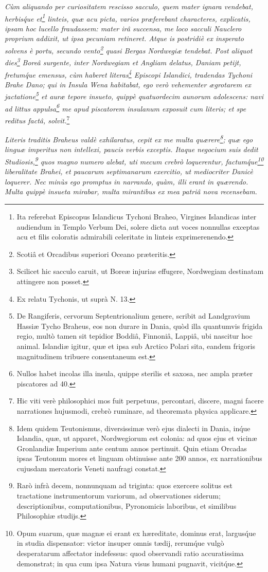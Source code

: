 \documentclass[a4paper, 11pt, oneside, polutonikogreek, german]{article}
\begin{document}
\emph{Cùm aliquando per curiositatem rescisso sacculo, quem mater ignara vendebat, herbis\'que et\footnote{Ita referebat Episcopus Islandicus Tychoni Braheo, Virgines Islandicas inter audiendum in Templo Verbum Dei, solere dicta aut voces nonnullas exceptas acu et filis coloratis admirabili celeritate in linteis exprimerenendo.} linteis, quæ acu picta, varios præferebant characteres, explicatis, ipsam hoc lucello fraudassem: mater irâ succensa, me loco sacculi Nauclero proprium addixit, ut ipsa pecuniam retineret. Atque is postridiè ex insperato solvens è portu, secundo vento\footnote{Scotiâ et Orcadibus superiori Oceano præteritis.} quasi Bergas Nordwegiæ tendebat. Post aliquot dies\footnote{Scilicet hic sacculo caruit, ut Boreæ injurias effugere, Nordwegiam destinatam attingere non posset.} Boreâ surgente, inter Nordwegiam et Angliam delatus, Daniam petijt, fretum\'que emensus, cùm haberet literas\footnote{Ex relatu Tychonis, ut suprà N. 13.} Episcopi Islandici, tradendas Tychoni Brahe Dano; qui in Insula Wena habitabat, ego verò vehementer ægrotarem ex jactatione\footnote{De Rangiferis, cervorum Septentrionalium genere, scribit ad Landgravium Hassiæ Tycho Braheus, eos non durare in Dania, quòd illa quantumvis frigida regio, multò tamen sit tepidior Boddiâ, Finnoniâ, Lappiâ, ubi nascitur hoc animal. Islandiæ igitur, quæ et ipsa sub Arctico Polari sita, eandem frigoris magnitudinem tribuere consentaneum est.} et auræ tepore insueto, quippè quatuordecim aunorum adolescens: navi ad littus appulsa\footnote{Nullos habet incolas illa insula, quippe sterilis et saxosa, nec ampla præter piscatores ad 40.} me apud piscatorem insulanum exposuit cum literis; et spe reditus factâ, solvit.}\footnote{Hic viti verè philosophici mos fuit perpetuus, percontari, discere, magni facere narrationes hujusmodi, crebrò ruminare, ad theoremata physica applicare.}

\emph{Literis traditis Braheus valdè exhilaratus, cepit ex me multa quærere\footnote{Idem quidem Teutonismus, diversissimæ verò ejus dialecti in Dania, in\'que Islandia, quæ, ut apparet, Nordwegiorum est colonia: ad quos ejus et vicinæ Gronlandiæ Imperium ante centum annos pertinuit. Quin etiam Orcadas ipsas Teutonum mores et linguam obtinuisse ante 200 annos, ex narrationibus cujusdam mercatoris Veneti naufragi constat.}; quæ ego linguæ imperitus non intellexi, paucis verbis exceptis. Itaque negocium suis dedit Studiosis,\footnote{Rarò infrà decem, nonnunquam ad triginta: quos exercere solitus est tractatione instrumentorum variorum, ad observationes siderum; descriptionibus, computationibus, Pyronomicis laboribus, et similibus Philosophiæ studijs.} quos magno numero alebat, uti mecum crebrò loquerentur, factum\'que\footnote{Opum suarum, quæ magnæ ei erant ex hæreditate, dominus erat, largus\'que in studia dispensator: victor insuper omnis tædij, rerum\'que vulgò desperatarum affectator indefessus: quod observandi ratio accuratissima demonstrat; in qua cum ipsa Natura visus humani pugnavit, vicit\'que.} liberalitate Brahei, et paucarum septimanarum exercitio, ut mediocriter Danicè loquerer. Nec minùs ego promptus in narrando, quàm, illi erant in quærendo. Multa quippè insueta mirabar, multa mirantibus ex mea patriâ nova recensebam.}
\end{document}
